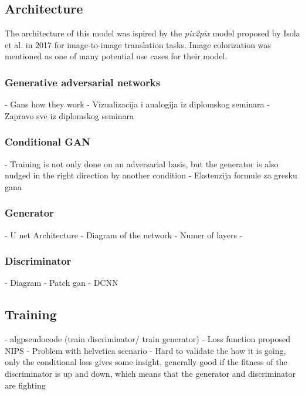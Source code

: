 \subsection{Architecture}

The architecture of this model was ispired by the \textit{pix2pix} model proposed
by Isola et al. in 2017 for image-to-image translation tasks. Image colorization
was mentioned as one of many potential use cases for their model. 

\subsubsection{Generative adversarial networks}

- Gans how they work
- Vizualizacija i analogija iz diplomskog seminara
- Zapravo sve iz diplomskog seminara

\subsubsection{Conditional GAN}

- Training is not only done on an adversarial basis, but the generator is also nudged in the right direction by another condition
- Ekstenzija formule za gresku gana

\subsubsection{Generator}

- U net Architecture
- Diagram of the network
- Numer of layers
- 

\subsubsection{Discriminator}

- Diagram
- Patch gan
- DCNN

\subsection{Training}

- algpseudocode (train discriminator/ train generator)
- Loss function proposed NIPS \citep{goodfellow2017nips}
- Problem with helvetica scenario \citep{goodfellow2014generative}
- Hard to validate the how it is going, only the conditional loss gives some insight, generally good if the fitness of the discriminator is up and down, which means that the generator and discriminator are fighting

